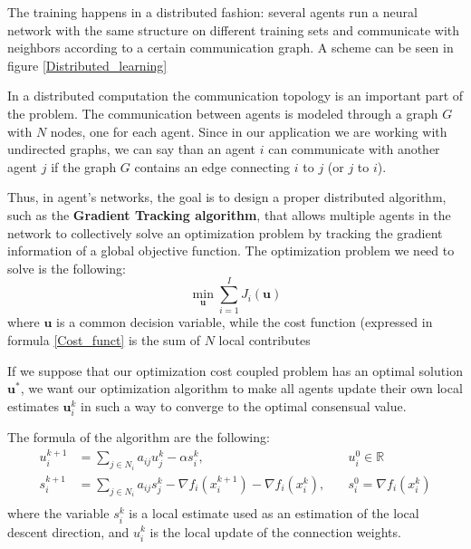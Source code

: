 \documentclass[a4paper,11pt,oneside]{book}
\begin{document}
The training happens in a distributed fashion: several agents run a neural network with the same structure on different training sets and communicate with neighbors according to a certain communication graph. A scheme can be seen in figure \ref{Distributed_learning}

\bigskip
In a distributed computation the communication topology is an important part of the problem. The communication between agents is modeled through a graph $G$ with $N$ nodes, one for each agent. Since in our application we are working with undirected graphs, we can say than an agent $i$ can communicate with another agent $j$ if the graph $G$ contains an edge connecting $i$ to $j$ (or $j$ to $i$).

\bigskip
Thus, in agent's networks, the goal is to design a proper distributed algorithm, such as the \textbf{Gradient Tracking algorithm}, that allows multiple agents in the network to collectively solve an optimization problem by tracking the gradient information of a global objective function.
The optimization problem we need to solve is the following:
\begin{equation}
\min_{\textbf{u}} \sum_{i=1}^I J_i(\textbf{u})
\end{equation}
where $\textbf{u}$ is a common decision variable, while the cost function (expressed in formula \ref{Cost_funct} is the sum of $N$ local contributes

\bigskip
If we suppose that our optimization cost coupled problem has an optimal solution $\textbf{u}^*$, we want our optimization algorithm to make all agents update their own local estimates $\textbf{u}_i^k$ in such a way to converge to the optimal consensual value.

The formula of the algorithm are the following:
\begin {equation}
\begin{aligned}
u_i^{k+1} &= \sum_{j \in N_i} a_{ij} u_j^k - \alpha s_i^k, \quad & u_i^0 \in \mathbb{R}\\
s_i^{k+1}   &= \sum_{j \in N_i} a_{ij} s_j^k - \nabla f_i(x_i^{k+1}) - \nabla f_i(x_i^k) , \quad & s_i^0 = \nabla f_i(x_i^k) \\
\end{aligned}
\end{equation}
where the variable $s_i^k$ is a local estimate used as an estimation of the local descent direction, and $u_i^k$ is the local update of the connection weights. 
\end{document}
